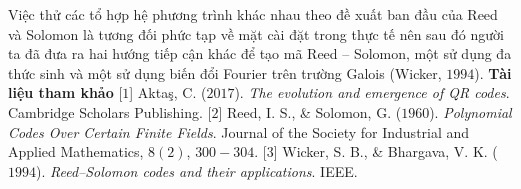 \begin{multicols}{2}
\vskip 0.1cm
	Việc thử các tổ hợp hệ phương trình khác nhau theo đề xuất ban đầu của Reed và Solomon là tương đối phức tạp về mặt cài đặt trong thực tế nên sau đó người ta đã đưa ra hai hướng tiếp cận khác để tạo mã Reed -- Solomon, một sử dụng đa thức sinh và một sử dụng biến đổi Fourier trên trường Galois (Wicker, $1994$).
	\vskip 0.1cm
	\textbf{\color{toanhocdoisong}Tài liệu tham khảo}
	\vskip 0.1cm
	[$1$] Aktaş, C. ($2017$). \textit{The evolution and emergence of QR codes}. Cambridge Scholars Publishing.
	\vskip 0.1cm
	[$2$] Reed, I. S., \& Solomon, G. ($1960$). \textit{Polynomial Codes Over Certain Finite Fields}. Journal of the Society for Industrial and Applied Mathematics, $8(2)$, $300-304$. 
	\vskip 0.1cm
	[$3$] Wicker, S. B., \& Bhargava, V. K. ($1994$). \textit{Reed--Solomon codes and their applications}. IEEE.
\end{multicols}